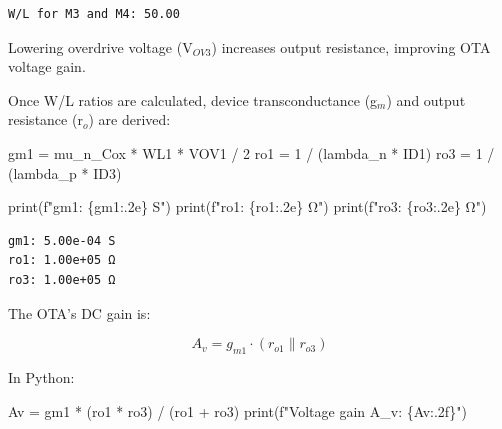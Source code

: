 \documentclass[
  letterpaper,
]{scrbook}
\newenvironment{Shaded}{}{}
\newcommand{\BuiltInTok}[1]{\textcolor[rgb]{0.84,0.23,0.29}{#1}}
\newcommand{\DecValTok}[1]{\textcolor[rgb]{0.00,0.36,0.77}{#1}}
\newcommand{\NormalTok}[1]{\textcolor[rgb]{0.14,0.16,0.18}{#1}}
\newcommand{\OperatorTok}[1]{\textcolor[rgb]{0.14,0.16,0.18}{#1}}
\newcommand{\SpecialCharTok}[1]{\textcolor[rgb]{0.00,0.36,0.77}{#1}}
\newcommand{\SpecialStringTok}[1]{\textcolor[rgb]{0.01,0.18,0.38}{#1}}
\begin{document}
\begin{verbatim}
W/L for M3 and M4: 50.00
\end{verbatim}

Lowering overdrive voltage (V\(_{OV3}\)) increases output resistance,
improving OTA voltage gain.

Once W/L ratios are calculated, device transconductance (g\(_m\)) and
output resistance (r\(_o\)) are derived:

\begin{Shaded}
\begin{Highlighting}[]
\NormalTok{gm1 }\OperatorTok{=}\NormalTok{ mu\_n\_Cox }\OperatorTok{*}\NormalTok{ WL1 }\OperatorTok{*}\NormalTok{ VOV1 }\OperatorTok{/} \DecValTok{2}
\NormalTok{ro1 }\OperatorTok{=} \DecValTok{1} \OperatorTok{/}\NormalTok{ (lambda\_n }\OperatorTok{*}\NormalTok{ ID1)}
\NormalTok{ro3 }\OperatorTok{=} \DecValTok{1} \OperatorTok{/}\NormalTok{ (lambda\_p }\OperatorTok{*}\NormalTok{ ID3)}

\BuiltInTok{print}\NormalTok{(}\SpecialStringTok{f"gm1: }\SpecialCharTok{\{}\NormalTok{gm1}\SpecialCharTok{:.2e\}}\SpecialStringTok{ S"}\NormalTok{)}
\BuiltInTok{print}\NormalTok{(}\SpecialStringTok{f"ro1: }\SpecialCharTok{\{}\NormalTok{ro1}\SpecialCharTok{:.2e\}}\SpecialStringTok{ Ω"}\NormalTok{)}
\BuiltInTok{print}\NormalTok{(}\SpecialStringTok{f"ro3: }\SpecialCharTok{\{}\NormalTok{ro3}\SpecialCharTok{:.2e\}}\SpecialStringTok{ Ω"}\NormalTok{)}
\end{Highlighting}
\end{Shaded}

\begin{verbatim}
gm1: 5.00e-04 S
ro1: 1.00e+05 Ω
ro3: 1.00e+05 Ω
\end{verbatim}

The OTA's DC gain is:

\[
A_v = g_{m1} \cdot (r_{o1} \parallel r_{o3})
\]

In Python:

\begin{Shaded}
\begin{Highlighting}[]
\NormalTok{Av }\OperatorTok{=}\NormalTok{ gm1 }\OperatorTok{*}\NormalTok{ (ro1 }\OperatorTok{*}\NormalTok{ ro3) }\OperatorTok{/}\NormalTok{ (ro1 }\OperatorTok{+}\NormalTok{ ro3)}
\BuiltInTok{print}\NormalTok{(}\SpecialStringTok{f"Voltage gain A\_v: }\SpecialCharTok{\{}\NormalTok{Av}\SpecialCharTok{:.2f\}}\SpecialStringTok{"}\NormalTok{)}
\end{Highlighting}
\end{Shaded}
\end{document}
